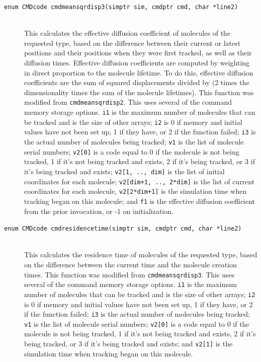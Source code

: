 \documentclass {scrbook}
\newcommand {\ttt} {\texttt}
\begin{document}
\begin{description}
\item[\ttt{enum CMDcode cmdmeansqrdisp3(simptr sim, cmdptr cmd, char *line2)}]
\hfill \\
This calculates the effective diffusion coefficient of molecules of the requested type, based on the difference between their current or latest positions and their positions when they were first tracked, as well as their diffusion times. Effective diffusion coefficients are computed by weighting in direct proportion to the molecule lifetime. To do this, effective diffusion coefficients are the sum of squared displacements divided by (2 times the dimensionality times the sum of the molecule lifetimes). This function was modified from \ttt{cmdmeansqrdisp2}. This uses several of the command memory storage options. \ttt{i1} is the maximum number of molecules that can be tracked and is the size of other arrays; \ttt{i2} is 0 if memory and initial values have not been set up, 1 if they have, or 2 if the function failed; \ttt{i3} is the actual number of molecules being tracked; \ttt{v1} is the list of molecule serial numbers; \ttt{v2[0]} is a code equal to 0 if the molecule is not being tracked, 1 if it's not being tracked and exists, 2 if it's being tracked, or 3 if it's being tracked and exists; \ttt{v2[1, .., dim]} is the list of initial coordinates for each molecule; \ttt{v2[dim+1, .., 2*dim]} is the list of current coordinates for each molecule, \ttt{v2[2*dim+1]} is the simulation time when tracking began on this molecule; and \ttt{f1} is the effective diffusion coefficient from the prior invocation, or -1 on initialization.

\item[\ttt{enum CMDcode cmdresidencetime(simptr sim, cmdptr cmd, char *line2)}]
\hfill \\
This calculates the residence time of molecules of the requested type, based on the difference between the current time and the molecule creation times. This function was modified from \ttt{cmdmeansqrdisp3}. This uses several of the command memory storage options. \ttt{i1} is the maximum number of molecules that can be tracked and is the size of other arrays; \ttt{i2} is 0 if memory and initial values have not been set up, 1 if they have, or 2 if the function failed; \ttt{i3} is the actual number of molecules being tracked; \ttt{v1} is the list of molecule serial numbers; \ttt{v2[0]} is a code equal to 0 if the molecule is not being tracked, 1 if it's not being tracked and exists, 2 if it's being tracked, or 3 if it's being tracked and exists; and \ttt{v2[1]} is the simulation time when tracking began on this molecule.


\end{description}
\end{document}

